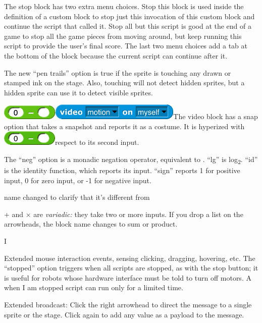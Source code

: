 The stop block has two extra menu choices. Stop this block is used
inside the definition of a custom block to stop just this invocation of
this custom block and continue the script that called it. Stop all but
this script is good at the end of a game to stop all the game pieces
from moving around, but keep running this script to provide the user's
final score. The last two menu choices add a tab at the bottom of the
block because the current script can continue after it.

The new ``pen trails'' option is true if the sprite is touching any
drawn or stamped ink on the stage. Also, touching will not detect hidden
sprites, but a hidden sprite can use it to detect visible sprites.

\includegraphics[width=1.05972in,height=0.27986in]{media/image304.png}\includegraphics[width=2.43333in,height=0.3in]{media/image305.png}The
video block has a snap option that takes a snapshot and reports it as a
costume. It is hyperized with
\includegraphics[width=1.05208in,height=0.28125in]{media/image306.png}respect
to its second input.

The ``neg'' option is a monadic negation operator, equivalent to .
``lg'' is log\textsubscript{2}. ``id'' is the identity function, which
reports its input. ``sign'' reports 1 for positive input, 0 for zero
input, or -1 for negative input.

name changed to clarify that it's different from

+ and × are \emph{variadic:} they take two or more inputs. If you drop a
list on the arrowheads, the block name changes to sum or product.

I

Extended mouse interaction events, sensing clicking, dragging, hovering,
etc. The ``stopped'' option triggers when all scripts are stopped, as
with the stop button; it is useful for robots whose hardware interface
must be told to turn off motors. A when I am stopped script can run only
for a limited time.

\label{broadcast}{}Extended broadcast: Click the right
arrowhead to direct the message to a single sprite or the stage. Click
again to add any value as a payload to the message.


